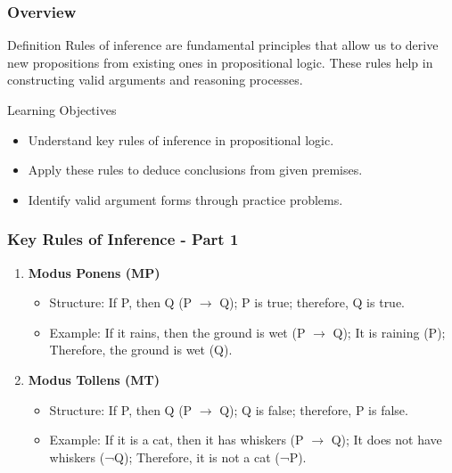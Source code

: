 \documentclass[aspectratio=169]{beamer}
\begin{document}
\begin{frame}[fragile]
    \frametitle{Overview}
    \begin{block}{Definition}
        Rules of inference are fundamental principles that allow us to derive new propositions from existing ones in propositional logic. These rules help in constructing valid arguments and reasoning processes.
    \end{block}

    \begin{block}{Learning Objectives}
        \begin{itemize}
            \item Understand key rules of inference in propositional logic.
            \item Apply these rules to deduce conclusions from given premises.
            \item Identify valid argument forms through practice problems.
        \end{itemize}
    \end{block}
\end{frame}

\begin{frame}[fragile]
    \frametitle{Key Rules of Inference - Part 1}
    \begin{enumerate}
        \item \textbf{Modus Ponens (MP)}
            \begin{itemize}
                \item Structure: If P, then Q (P $\rightarrow$ Q); P is true; therefore, Q is true.
                \item Example: If it rains, then the ground is wet (P $\rightarrow$ Q); It is raining (P); Therefore, the ground is wet (Q).
            \end{itemize}
        
        \item \textbf{Modus Tollens (MT)}
            \begin{itemize}
                \item Structure: If P, then Q (P $\rightarrow$ Q); Q is false; therefore, P is false.
                \item Example: If it is a cat, then it has whiskers (P $\rightarrow$ Q); It does not have whiskers (¬Q); Therefore, it is not a cat (¬P).
            \end{itemize}
    \end{enumerate}
\end{frame}
\end{document}
